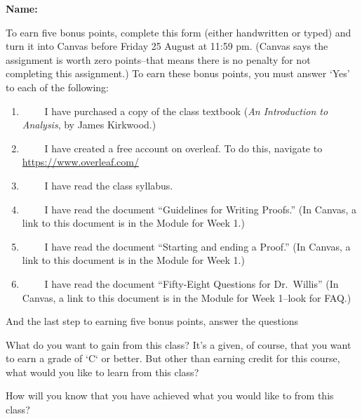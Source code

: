 \documentclass[12pt,fleqn]{exam}
\newcommand\PM{{\sc pm}}
\newcommand{\quiz}{0}
\newcommand{\term}{Fall}
\begin{document}
\large
\vspace{0.1in}
\noindent{}
{\bf Name:}  \\
\noindent \makebox[3.0truein][l]{\bf Bonus Homework   \quiz, \term \/ \the\year}
\vspace{0.1in}

\noindent  To earn five bonus points, complete this form (either handwritten or typed) and turn it into Canvas before 
Friday 25 August  at 11:59 \PM.  (Canvas says the assignment is worth zero points--that means there is no penalty for
not completing this assignment.) To earn these bonus points, you must answer `Yes' to each of the following:

\begin{enumerate}

\item \underline{$\phantom{YES}$} I have purchased a copy of the class textbook (\emph{An Introduction to Analysis}, 
by James Kirkwood.)

\item \underline{$\phantom{YES}$}  I have created a free  account on overleaf. To do this, navigate to \url{https://www.overleaf.com/}
 
\item \underline{$\phantom{YES}$} I have read the class syllabus.

\item  \underline{$\phantom{YES}$} I have read the document ``Guidelines for Writing Proofs.'' (In Canvas, a link to this
document is in the Module for Week 1.)

\item  \underline{$\phantom{YES}$} I have read the document ``Starting and ending a Proof.'' (In Canvas, a link to this
document is in the Module for Week 1.)

\item  \underline{$\phantom{YES}$} I have read the document ``Fifty-Eight Questions for Dr.\ Willis''  (In Canvas, a link to this
document is in the Module for Week 1--look for FAQ.)

\end{enumerate}
And the last step to earning five bonus points, answer the questions

\begin{questions}

\question What do you want to gain from this class?  It's a given, of course, that you want to earn a grade of `C` or better. But other than earning credit for this course, what would you like to learn from this class?

\begin{solution}[1.5in]

\end{solution}

\question How will you know that you have achieved what you would like to from this class?  
\end{questions}
\end{document}
